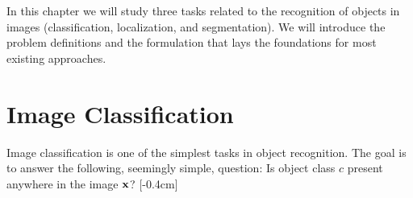 In this chapter we will study three tasks related to the recognition of objects in images (classification, localization, and segmentation). We will introduce the problem definitions and the formulation that lays the foundations for most existing approaches. 










\section{Image Classification}
\label{sec:image_classification}


Image classification is one of the simplest tasks in object recognition. The goal is to answer the following, seemingly simple, question: Is object class $c$ present anywhere in the image ${\bf x}$?
[-0.4cm]

